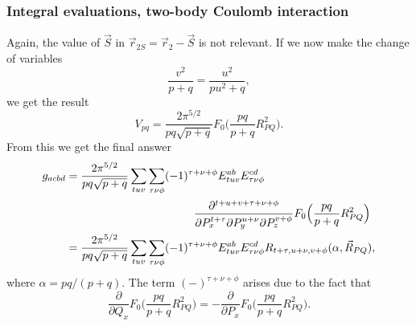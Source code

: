 \frame
{
  \frametitle{Integral evaluations, two-body Coulomb interaction}
\begin{small}
{\scriptsize
Again, the value of $\vec S$ in $\vec r_{2S} = \vec r_2 - \vec S$ is not relevant. If we now make the change of variables
\begin{equation}
 \frac{v^2}{p+q} = \frac{u^2}{pu^2+q},
\end{equation}
we get the result
\begin{equation}
 V_{pq} = \frac{2\pi^{5/2}}{pq\sqrt{p+q}}F_0\Big(\frac{pq}{p+q}R^2_{PQ}\Big).
\end{equation}
From this we get the final answer
\begin{equation}
\begin{split}
 g_{acbd} & = \frac{2\pi^{5/2}}{pq\sqrt{p+q}}\sum_{tuv}\sum_{\tau\nu\phi}(-1)^{\tau+\nu+\phi}E^{ab}_{tuv}E^{cd}_{\tau\nu\phi} \\
          & \hspace{40mm} \frac{\partial^{t+u+v+\tau+\nu+\phi}}{\partial P_x^{t+\tau} \partial P_y^{u+\nu} \partial P_z^{v+\phi}}F_0\Big(\frac{pq}{p+q}R^2_{PQ}\Big) \\
          & = \frac{2\pi^{5/2}}{pq\sqrt{p+q}}\sum_{tuv}\sum_{\tau\nu\phi}(-1)^{\tau+\nu+\phi}E^{ab}_{tuv}E^{cd}_{\tau\nu\phi}R_{t+\tau,u+\nu,v+\phi}(\alpha,\vec R_{PQ}),
\end{split}
\end{equation}
where $\alpha = pq/(p+q)$. The term $(-)^{\tau+\nu+\phi}$ arises due to the fact that
\begin{equation}
\frac{\partial}{\partial Q_x} F_0\Big(\frac{pq}{p+q}R^2_{PQ}\Big) = - \frac{\partial}{\partial P_x} F_0\Big(\frac{pq}{p+q}R^2_{PQ}\Big).
\end{equation}
}
\end{small}
}
\frame
